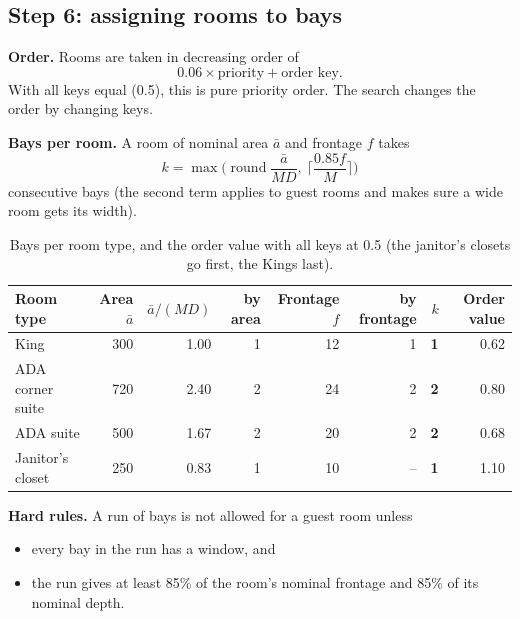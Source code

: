 \documentclass[10pt,a4paper]{article}
\begin{document}
\subsection{Step 6: assigning rooms to bays}
\textbf{Order.} Rooms are taken in decreasing order of
\[ 0.06 \times \text{priority} + \text{order key}. \]
With all keys equal (0.5), this is pure priority order. The search changes the order by changing keys.

\textbf{Bays per room.} A room of nominal area $\bar a$ and frontage $f$ takes
\[ k = \max\!\Big(\operatorname{round}\frac{\bar a}{M D},\ \Big\lceil \frac{0.85 f}{M} \Big\rceil\Big) \]
consecutive bays (the second term applies to guest rooms and makes sure a wide room gets its width).
\begin{table}[H]\centering\small\caption{Bays per room type, and the order value with all keys at 0.5 (the janitor's closets go first, the Kings last).}\label{tab:k}
\begin{tabular}{@{}l r r r r r r r@{}}
\toprule
\textbf{Room type} & \textbf{Area $\bar a$} & \textbf{$\bar a / (MD)$} & \textbf{by area} & \textbf{Frontage $f$} & \textbf{by frontage} & \textbf{$k$} & \textbf{Order value} \\ \midrule
King & 300 & 1.00 & 1 & 12 & 1 & \textbf{1} & 0.62 \\
ADA corner suite & 720 & 2.40 & 2 & 24 & 2 & \textbf{2} & 0.80 \\
ADA suite & 500 & 1.67 & 2 & 20 & 2 & \textbf{2} & 0.68 \\
Janitor's closet & 250 & 0.83 & 1 & 10 & -- & \textbf{1} & 1.10 \\
\bottomrule
\end{tabular}
\end{table}

\textbf{Hard rules.} A run of bays is not allowed for a guest room unless
\begin{itemize}
\item every bay in the run has a window, and
\item the run gives at least 85\% of the room's nominal frontage and 85\% of its nominal depth.
\end{itemize}
\end{document}
